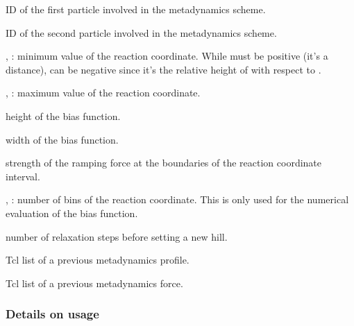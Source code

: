 \begin{arguments}
\item[\var{pid_1}] ID of the first particle involved in the
  metadynamics scheme.
\item[\var{pid_2}] ID of the second particle involved in the
  metadynamics scheme.
\item[\var{d_\mathrm{min}}, \var{z_\mathrm{min}}]: minimum value of
  the reaction coordinate. While  must be positive
  (it's a distance),  can be negative since it's
  the relative height of  with respect to .
\item[\var{d_\mathrm{max}}, \var{z_\mathrm{max}}]: maximum value of
  the reaction coordinate. 
\item[\var{b_\mathrm{height}}] height of the bias function.
\item[\var{b_\mathrm{width}}] width of the bias function.
\item[\var{f_\mathrm{bound}}] strength of the ramping force at the
  boundaries of the reaction coordinate interval.
\item[\var{d_\mathrm{bins}}, \var{z_\mathrm{bins}}]: number of bins of
  the reaction coordinate. This is only used for the numerical evaluation of the bias function.
\item[\var{numrelaxationsteps}] number of relaxation steps before setting a new hill. 
\item[\var{profile\_list}] Tcl list of a previous metadynamics
  profile.
\item[\var{force\_list}] Tcl list of a previous metadynamics force.
\end{arguments}

\subsubsection{Details on usage}

